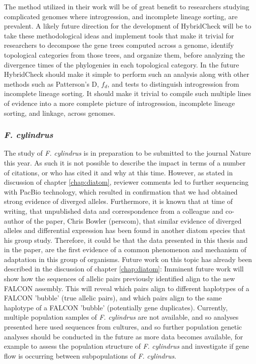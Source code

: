 The method utilized in their work will be of great benefit to researchers studying complicated genomes where introgression, and incomplete lineage sorting, are prevalent.
A likely future direction for the development of HybridCheck will be to take these methodological ideas and implement tools that make it trivial for researchers to decompose the gene trees computed across a genome, identify topological categories from those trees, and organize them, before analyzing the divergence times of the phylogenies in each topological category.
In the future HybridCheck should make it simple to perform such an analysis along with other methods such as Patterson's D, $f_d$, and tests to distinguish introgression from incomplete lineage sorting.
It should make it trivial to compile such multiple lines of evidence into a more complete picture of introgression, incomplete lineage sorting, and linkage, across genomes.


\subsubsection{\textit{F. cylindrus}}

The study of \textit{F. cylindrus} is in preparation to be submitted to the journal Nature this year.
As such it is not possible to describe the impact in terms of a number of citations, or who has cited it and why at this time.
However, as stated in discussion of chapter \ref{chap:diatom}, reviewer comments led to further sequencing with PacBio technology, which resulted in confirmation that we had obtained strong evidence of diverged alleles.
Furthermore, it is known that at time of writing, that unpublished data and correspondence from a colleague and co-author of the paper, Chris Bowler (perscom), that similar evidence of diverged alleles and differential expression has been found in another diatom species that his group study.
Therefore, it could be that the data presented in this thesis and in the paper, are the first evidence of a common phenomenon and mechanism of adaptation in this group of organisms.
Future work on this topic has already been described in the discussion of chapter \ref{chap:diatom}:
Imminent future work will show how the sequences of allelic pairs previously identified align to the new FALCON assembly.
This will reveal which pairs align to different haplotypes of a FALCON 'bubble' (true allelic pairs), and which pairs align to the same haplotype of a FALCON 'bubble' (potentially gene duplicates).
Currently, multiple population samples of \textit{F. cylindrus} are not available, and so analyses presented here used sequences from cultures, and so further population genetic analyses should be conducted in the future as more data becomes available, for example to assess the population structure of \textit{F. cylindrus} and investigate if gene flow is occurring between subpopulations of \textit{F. cylindrus}.


